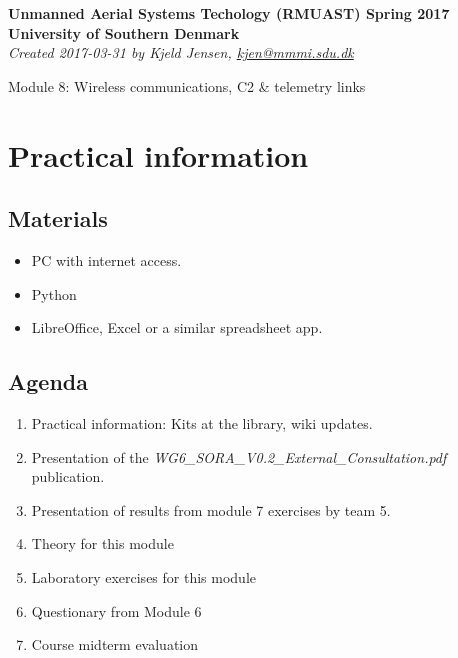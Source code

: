 \documentclass[a4paper,10pt,fleqn]{article}
\begin{document}
\Large
\textbf{Unmanned Aerial Systems Techology (RMUAST) Spring 2017 \\ University of Southern Denmark} \vspace{2mm}\\
\large \textit{Created 2017-03-31 by Kjeld Jensen, \href{mailto:kjen@mmmi.sdu.dk}{kjen@mmmi.sdu.dk}} \\

\vspace{3mm}

\LARGE Module 8: Wireless communications, C2 \& telemetry links

\normalsize

\section{Practical information}

\subsection{Materials}

\begin{itemize}
\item PC with internet access.
\item Python
\item LibreOffice, Excel or a similar spreadsheet app.

\end{itemize}

\subsection{Agenda}

\begin{enumerate}
	\item Practical information: Kits at the library, wiki updates.
	\item Presentation of the \textit{WG6\_SORA\_V0.2\_External\_Consultation.pdf} publication.
	\item Presentation of results from module 7 exercises by team 5.
	\item Theory for this module
	\item Laboratory exercises for this module 
	\item Questionary from Module 6
	\item Course midterm evaluation
\end{enumerate}
\end{document}
